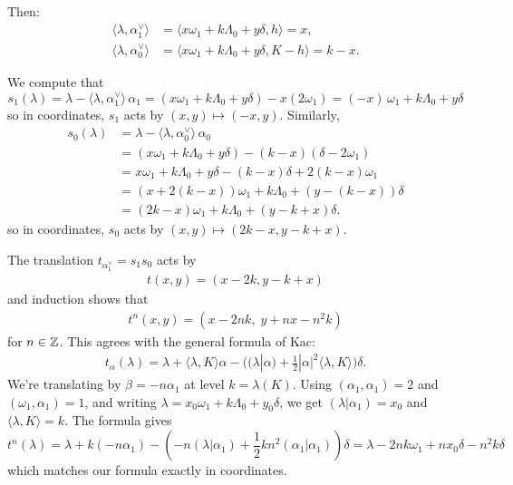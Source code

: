 \documentclass[12pt]{article}
\begin{document}
Then:
\[\begin{aligned}
\langle \lambda, \alpha_1^\vee\rangle &= \langle x\omega_1 + k\Lambda_0 + y\delta, h\rangle = x, \\
\langle \lambda, \alpha_0^\vee\rangle &= \langle x\omega_1 + k\Lambda_0 + y\delta, K-h\rangle = k - x.
\end{aligned}\]

We compute that 
\[s_1(\lambda) = \lambda - \langle \lambda, \alpha_1^\vee\rangle\, \alpha_1
= (x\omega_1 + k\Lambda_0 + y\delta) - x(2\omega_1)
= (-x)\,\omega_1 + k\Lambda_0 + y\delta\] so in coordinates, $s_1$ acts by $(x,y) \mapsto (-x,y)$. Similarly,
\[\begin{aligned}
s_0(\lambda) &= \lambda - \langle \lambda, \alpha_0^\vee\rangle\, \alpha_0 \\
&= (x\omega_1 + k\Lambda_0 + y\delta) - (k-x)(\delta - 2\omega_1) \\
&= x\omega_1 + k\Lambda_0 + y\delta - (k-x)\delta + 2(k-x)\omega_1 \\
&= (x + 2(k - x))\omega_1 + k\Lambda_0 + (y - (k - x))\delta \\
&= (2k - x)\omega_1 + k\Lambda_0 + (y - k + x)\delta.
\end{aligned}\]
so in coordinates, $s_0$ acts by $(x,y) \mapsto (2k - x, y - k + x)$.

The translation $t_{\alpha_1^\vee} = s_1s_0$ acts by \begin{align*}
    t(x,y)=(x-2k,y-k+x)
\end{align*} and induction shows that \begin{align*} 
    t^n(x,y) = (x - 2nk, \; y + n x - n^2 k)
\end{align*} for $n \in \mathbb{Z}$. This agrees with the general formula of Kac: 
\begin{align*}
    t_\alpha(\lambda) 
    = \lambda + \langle \lambda, K \rangle \alpha 
      - \big( (\lambda|\alpha)
      + \tfrac{1}{2}|\alpha|^2 \langle \lambda, K \rangle \big)\delta.
\end{align*}
We're translating by $\beta=-n\alpha_1$ at level $k=\lambda(K)$. Using $(\alpha_1,\alpha_1)=2$ and $(\omega_1,\alpha_1)=1$, and writing $\lambda = x_0\omega_1 + k\Lambda_0 + y_0\delta$, we get $(\lambda|\alpha_1)=x_0$ and $\langle \lambda,K\rangle = k$. The formula gives \[t^n(\lambda) = \lambda + k(-n\alpha_1) - ( -n(\lambda|\alpha_1) + \frac{1}{2} kn^2(\alpha_1|\alpha_1))\delta = \lambda - 2nk\omega_1 + nx_0\delta - n^2k\delta\] which matches our formula exactly in coordinates.
\end{document}
